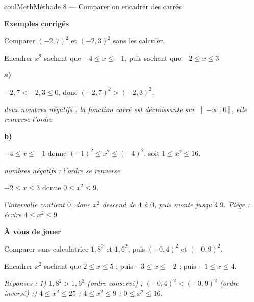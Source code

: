 \documentclass[11pt,a4paper]{article}
\makeatletter
\renewcommand{\le}{\leqslant}
\newcommand{\lycee@intof}[2]{\left]#1\,;#2\right]}
\providecommand{\intof}{\lycee@intof}%
\newcounter{lycee@signet}
\newcommand{\signet}[3][]{\stepcounter{lycee@signet}%
  \edef\lycee@dest{\if\relax\detokenize{#1}\relax
    signet.\arabic{lycee@signet}\else#1\fi}%
  \hypertarget{\lycee@dest}{}\bookmark[level=#2,dest=\lycee@dest]{#3}}
\newcommand{\res}[1]{#1}
\newcounter{methode}
\newenvironment{methodebox}[1][Méthode]{\stepcounter{methode}%
  \begin{boitecours}[phantom={\signet[methode-\arabic{methode}]{2}{#1}}]{coulMeth}{#1}}%
  {\end{boitecours}}
\newcommand{\etape}[1]{\par\smallskip\textbf{\color{coulMeth}#1}\par\nobreak\smallskip}
\newcommand{\reponse}[1]{\par\smallskip
  {\footnotesize\itshape\color{black!55}Réponses : #1}}
\newcommand{\explique}[2]{\par\smallskip\noindent
  \begin{minipage}[t]{0.57\linewidth}\raggedright #1\end{minipage}\hfill
  \begin{minipage}[t]{0.40\linewidth}\raggedright\leavevmode
    {\small\itshape\color{black!60}#2}\end{minipage}\par}
\newcommand{\cas}[1]{\par\smallskip\noindent\textbf{\color{coulExo}#1}\vadjust{\nobreak}}
\newenvironment{correction}{\par}{\par}
\newcommand{\etapeexemples}{\etape{Exemples corrigés}}
\makeatother
\begin{document}
\begin{methodebox}[Méthode 8 --- Comparer ou encadrer des carrés]
\etapeexemples
\begin{questions}[label=\alph*)]
  \item Comparer $(-2{,}7)^{2}$ et $(-2{,}3)^{2}$ sans les calculer.
  \item Encadrer $x^{2}$ sachant que $-4\le x\le -1$, puis sachant que $-2\le x\le 3$.
\end{questions}
\begin{correction}
\cas{a)}
\explique{$-2{,}7<-2{,}3\le 0$, donc $\res{(-2{,}7)^{2}>(-2{,}3)^{2}}$.}{deux nombres négatifs :
la fonction carré est décroissante sur $\intof{-\infty}{0}$, elle renverse l'ordre}
\cas{b)}
\explique{$-4\le x\le -1$ donne $(-1)^{2}\le x^{2}\le (-4)^{2}$, soit $\res{1\le x^{2}\le
16}$.}{nombres négatifs : l'ordre se renverse}
\explique{$-2\le x\le 3$ donne $\res{0\le x^{2}\le 9}$.}{l'intervalle contient $0$, donc $x^{2}$
descend de $4$ à $0$, puis monte jusqu'à $9$. Piège : écrire $4\le x^{2}\le 9$}
\end{correction}

\etape{À vous de jouer}
\begin{questions}
  \item Comparer sans calculatrice $1{,}8^{2}$ et $1{,}6^{2}$, puis $(-0{,}4)^{2}$ et
        $(-0{,}9)^{2}$.
  \item Encadrer $x^{2}$ sachant que $2\le x\le 5$ ; puis $-3\le x\le -2$ ; puis
        $-1\le x\le 4$.
\end{questions}
\reponse{1\textdegree) $1{,}8^{2}>1{,}6^{2}$ (ordre conservé) ;\;
$(-0{,}4)^{2}<(-0{,}9)^{2}$ (ordre inversé) ;\; 2\textdegree) $4\le x^{2}\le 25$ ;\;
$4\le x^{2}\le 9$ ;\; $0\le x^{2}\le 16$.}
\end{methodebox}
\end{document}
